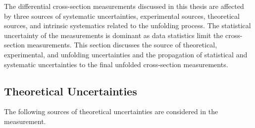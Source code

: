 The differential cross-section measurements discussed in this thesis are affected by three sources of systematic uncertainties, experimental sources, theoretical sources, and intrinsic systematics related to the unfolding process. The statistical uncertainty of the measurements is dominant as data statistics limit the cross-section measurements. This section discusses the source of theoretical, experimental, and unfolding uncertainties and the propagation of statistical and systematic uncertainties to the final unfolded cross-section measurements. 

\subsection{Theoretical Uncertainties}
\label{subsec:TheoryUnc}

The following sources of theoretical uncertainties are considered in the measurement.

